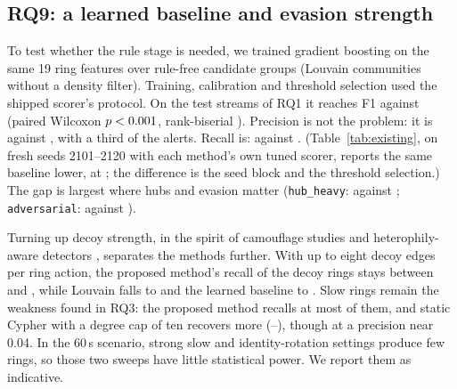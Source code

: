 \subsection{RQ9: a learned baseline and evasion strength}\label{sec:rq9}
To test whether the rule stage is needed, we trained gradient boosting on the
same 19 ring features over rule-free candidate groups (Louvain communities
without a density filter). Training, calibration and threshold selection used
the shipped scorer's protocol. On the test streams of RQ1 it reaches F1
\ThirteenGbF{} against \ThirteenPropF{} (paired Wilcoxon $p< 0.001$,
rank-biserial \ThirteenRb{}). Precision is not the problem: it is \ThirteenGbP{}
against \ThirteenPropP{}, with a third of the alerts. Recall is:
\ThirteenGbR{} against \ThirteenPropR{}. (Table~\ref{tab:existing}, on fresh seeds 2101--2120 with each method's own tuned scorer, reports the same baseline lower, at \RfExtabulargbF{}; the difference is the seed block and the threshold selection.) The gap is largest where hubs and
evasion matter (\texttt{hub\_heavy}: \ThirteenGbFHub{} against
\ThirteenPropFHub{}; \texttt{adversarial}: \ThirteenGbFAdv{} against
\ThirteenPropFAdv{}).

Turning up decoy strength, in the spirit of camouflage studies
\cite{liu2025robust} and heterophily-aware detectors \cite{hu2025hhgfd}, separates the methods further. With up to eight decoy
edges per ring action, the proposed method's recall of the decoy rings stays
between \FourteenDecoyPropLo{} and \FourteenDecoyPropHi{}, while Louvain falls
to \FourteenDecoyLouvainMax{} and the learned baseline to
\FourteenDecoyGbMax{}. Slow rings remain the weakness found in RQ3: the proposed
method recalls at most \FourteenSlowPropHi{} of them, and static Cypher with a
degree cap of ten recovers more (\FourteenSlowCapLo{}--\FourteenSlowCapHi{}),
though at a precision near 0.04. In the 60\,s scenario, strong slow and
identity-rotation settings produce few rings, so those two sweeps have little
statistical power. We report them as indicative.
